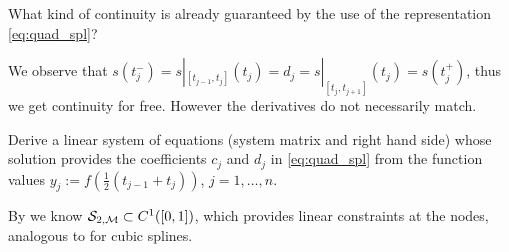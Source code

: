 \begin{problem}

\begin{subproblem}[1]  \label{subprb:QuadraticSplines_2}
What kind of continuity is already guaranteed by the use of the representation \eqref{eq:quad_spl}?


\begin{solution}
 We observe that $s(t_j^-)=s|_{[t_{j-1},t_{j}]}(t_j) = d_j = s|_{[t_{j},t_{j+1}]}(t_j)=s(t_j^+)$, thus we get continuity for free.
However the derivatives do not necessarily match.
\end{solution}
\end{subproblem}


\begin{subproblem}[3]  \label{subprb:QuadraticSplines_3} 
    Derive a linear system of equations (system matrix and right hand side) whose
    solution provides the coefficients $c_{j}$ and $d_{j}$ in \eqref{eq:quad_spl} from the
    function values $y_{j} := f(\frac{1}{2}(t_{j-1}+t_{j}))$, $j=1,\ldots,n$.

    \hint{} By  we know ${\cal S}_{2,{\cal M}}\subset C^{1}([0,1])$,
    which provides linear constraints at the nodes, analogous to  for
    cubic splines.



\end{subproblem}
\end{problem}
